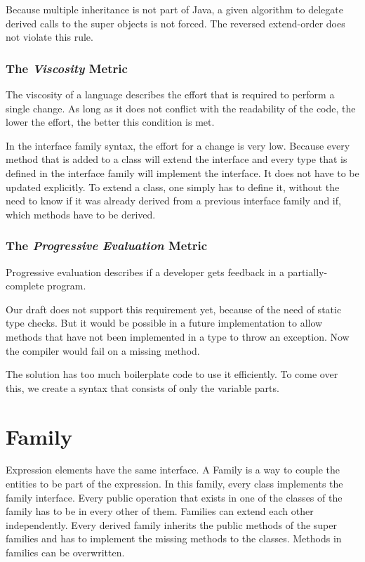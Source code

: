 \documentclass{report}
\begin{document}
Because multiple inheritance is not part of Java, a given algorithm to delegate derived calls to the super objects is not forced. The reversed extend-order does not violate this rule.

\subsubsection*{The \emph{Viscosity} Metric}

The viscosity of a language describes the effort that is required to perform a single change. As long as it does not conflict with the readability of the code, the lower the effort, the better this condition is met.

In the interface family syntax, the effort for a change is very low. Because every method that is added to a class will extend the interface and every type that is defined in the interface family will implement the interface. It does not have to be updated explicitly. To extend a class, one simply has to define it, without the need to know if it was already derived from a previous interface family and if, which methods have to be derived.

\subsubsection*{The \emph{Progressive Evaluation} Metric}

Progressive evaluation describes if a developer gets feedback in a partially-complete program.

Our draft does not support this requirement yet, because of the need of static type checks. But it would be possible in a future implementation to allow methods that have not been implemented in a type to throw an exception. Now the compiler would fail on a missing method.





\label{syntaxExtensionEP}
The solution has too much boilerplate code to use it efficiently. To come over this, we create a syntax that consists of only the variable parts.

\section{Family}

Expression elements have the same interface. A Family is a way to couple the entities to be part of the expression. In this family, every class implements the family interface. Every public operation that exists in one of the classes of the family has to be in every other of them. Families can extend each other independently. Every derived family inherits the public methods of the super families and has to implement the missing methods to the classes. Methods in families can be overwritten.
\end{document}

